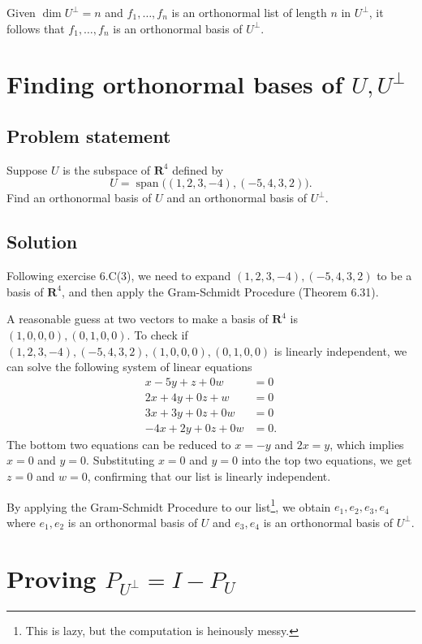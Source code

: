 \documentclass{article}
\begin{document}
Given $\dim U^\bot=n$ and $f_1,\ldots,f_n$ is an orthonormal list of length $n$ in $U^\bot$, it follows that $f_1,\ldots,f_n$ is an orthonormal basis of $U^\bot$.

\clearpage

\section{Finding orthonormal bases of $U,U^\bot$}
\subsection*{Problem statement}
Suppose $U$ is the subspace of $\mathbf{R}^4$ defined by
\[U=\operatorname{span}\big( (1,2,3,-4),(-5,4,3,2)\big).\]
Find an orthonormal basis of $U$ and an orthonormal basis of $U^\bot$.

\subsection*{Solution}
Following exercise 6.C(3), we need to expand $(1,2,3,-4),(-5,4,3,2)$ to be a basis of $\mathbf{R}^4$, and then apply the Gram-Schmidt Procedure (Theorem 6.31). 

A reasonable guess at two vectors to make a basis of $\mathbf{R}^4$ is \newline$(1,0,0,0),(0,1,0,0)$. 
To check if $(1,2,3,-4),(-5,4,3,2),(1,0,0,0),(0,1,0,0)$ is linearly independent, we can solve the following system of linear equations
\begin{align*}
    x-5y+z+0w&=0\\
    2x+4y+0z+w&=0\\
    3x+3y+0z+0w&=0\\
    -4x+2y+0z+0w&=0.
\end{align*}
The bottom two equations can be reduced to $x=-y$ and $2x=y$, which implies $x=0$ and $y=0$. 
Substituting $x=0$ and $y=0$ into the top two equations, we get $z=0$ and $w=0$, confirming that our list is linearly independent. 

By applying the Gram-Schmidt Procedure to our list\footnote{This is lazy, but the computation is heinously messy.}, we obtain $e_1,e_2,e_3,e_4$ where $e_1,e_2$ is an orthonormal basis of $U$ and $e_3,e_4$ is an orthonormal basis of $U^\bot$.

\clearpage

\section{Proving $P_{U^\bot}=I-P_{U}$}
\end{document}
